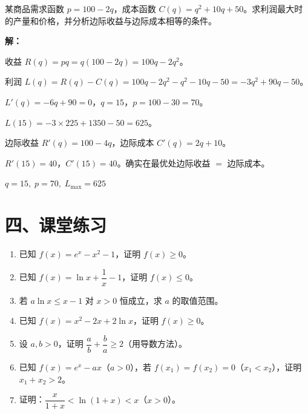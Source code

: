 \documentclass[12pt, a4paper]{ctexart}
\begin{document}
\begin{appbox}[【应用3】经济学边际分析]
某商品需求函数 $p=100-2q$，成本函数 $C(q)=q^2+10q+50$。求利润最大时的产量和价格，并分析边际收益与边际成本相等的条件。

\textbf{解：}

收益 $R(q)=pq=q(100-2q)=100q-2q^2$。

利润 $L(q)=R(q)-C(q)=100q-2q^2-q^2-10q-50=-3q^2+90q-50$。

$L'(q)=-6q+90=0$，$q=15$，$p=100-30=70$。

$L(15)=-3\times225+1350-50=625$。

边际收益 $R'(q)=100-4q$，边际成本 $C'(q)=2q+10$。

$R'(15)=40$，$C'(15)=40$。确实在最优处边际收益 $=$ 边际成本。

$\boxed{q=15,\; p=70,\; L_{\max}=625}$
\end{appbox}

\section*{\textcolor{tipgreen}{四、课堂练习}}

\begin{enumerate}[leftmargin=2em, itemsep=6pt]
  \item 已知 $f(x)=e^x-x^2-1$，证明 $f(x)\geq 0$。
  \item 已知 $f(x)=\ln x+\dfrac{1}{x}-1$，证明 $f(x)\leq 0$。
  \item 若 $a\ln x\leq x-1$ 对 $x>0$ 恒成立，求 $a$ 的取值范围。
  \item 已知 $f(x)=x^2-2x+2\ln x$，证明 $f(x)\geq 0$。
  \item 设 $a,b>0$，证明 $\dfrac{a}{b}+\dfrac{b}{a}\geq 2$（用导数方法）。
  \item 已知 $f(x)=e^x-ax$（$a>0$），若 $f(x_1)=f(x_2)=0$（$x_1<x_2$），证明 $x_1+x_2>2$。
  \item 证明：$\dfrac{x}{1+x}<\ln(1+x)<x$（$x>0$）。
\end{enumerate}
\end{document}
